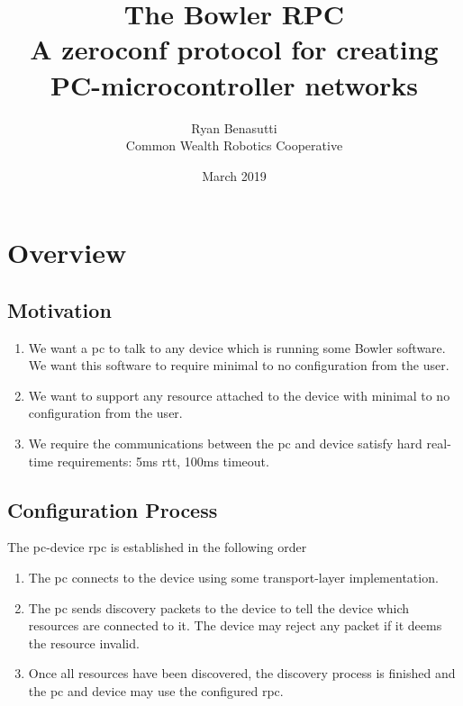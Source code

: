 \documentclass{article}
\title{
    The Bowler RPC \\
    \large A zeroconf protocol for creating PC-microcontroller networks
}
\author{Ryan Benasutti \\ Common Wealth Robotics Cooperative}
\date{March 2019}
\begin{document}
\maketitle

\section{Overview}
\subsection{Motivation}

\begin{enumerate}
    \item We want a \gls{pc} to talk to any \gls{device} which is running some Bowler software. We
    want this software to require minimal to no configuration from the user.
    
    \item We want to support any \gls{resource} attached to the \gls{device} with minimal to no
    configuration from the user.

    \item We require the communications between the \gls{pc} and \gls{device} satisfy hard real-time
    requirements: 5ms \gls{rtt}, 100ms timeout.
\end{enumerate}

\subsection{Configuration Process}

The \gls{pc}-\gls{device} \gls{rpc} is established in the following order
\begin{enumerate}
    \item The \gls{pc} connects to the \gls{device} using some \gls{transport-layer} implementation.
    
    \item The \gls{pc} sends \gls{discovery} packets to the \gls{device} to tell the \gls{device} which
    \glspl{resource} are connected to it. The \gls{device} may reject any packet if it deems the
    \gls{resource} invalid.
    
    \item Once all \glspl{resource} have been discovered, the \gls{discovery} process is finished and the
    \gls{pc} and \gls{device} may use the configured \gls{rpc}.
\end{enumerate}
\end{document}
